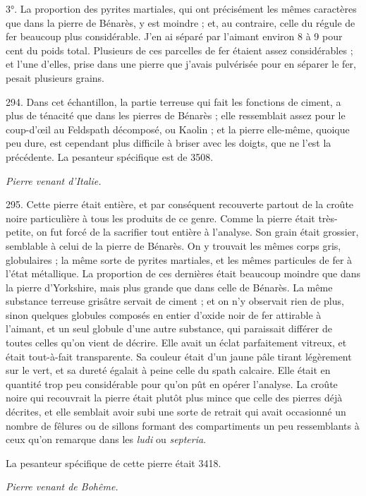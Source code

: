 \documentclass[a4paper, 11pt, oneside, polutonikogreek, french]{article}
\begin{document}
3°. La proportion des pyrites martiales, qui ont précisément les mêmes caractères que dans la pierre de Bénarès, y est moindre ; et, au contraire, celle du régule de fer beaucoup plus considérable. J'en ai séparé par l'aimant environ 8 à 9 pour cent du poids total. Plusieurs de ces parcelles de fer étaient assez considérables ; et l'une d'elles, prise dans une pierre que j'avais pulvérisée pour en séparer le fer, pesait plusieurs grains.

294. Dans cet échantillon, la partie terreuse qui fait les fonctions de ciment, a plus de ténacité que dans les pierres de Bénarès ; elle ressemblait assez pour le coup-d'œil au Feldspath décomposé, ou Kaolin ; et la pierre elle-même, quoique peu dure, est cependant plus difficile à briser avec les doigts, que ne l'est la précédente. La pesanteur spécifique est de 3508.

\emph{Pierre venant d'Italie.}

295. Cette pierre était entière, et par conséquent recouverte partout de la croûte noire particulière à tous les produits de ce genre. Comme la pierre était très-petite, on fut forcé de la sacrifier tout entière à l'analyse. Son grain était grossier, semblable à celui de la pierre de Bénarès. On y trouvait les mêmes corps gris, globulaires ; la même sorte de pyrites martiales, et les mêmes particules de fer à l'état métallique. La proportion de ces dernières était beaucoup moindre que dans la pierre d'Yorkshire, mais plus grande que dans celle de Bénarès. La même substance terreuse grisâtre servait de ciment ; et on n'y observait rien de plus, sinon quelques globules composés en entier d'oxide noir de fer attirable à l'aimant, et un seul globule d'une autre substance, qui paraissait différer de toutes celles qu'on vient de décrire. Elle avait un éclat parfaitement vitreux, et était tout-à-fait transparente. Sa couleur était d'un jaune pâle tirant légèrement sur le vert, et sa dureté égalait à peine celle du spath calcaire. Elle était en quantité trop peu considérable pour qu'on pût en opérer l'analyse. La croûte noire qui recouvrait la pierre était plutôt plus mince que celle des pierres déjà décrites, et elle semblait avoir subi une sorte de retrait qui avait occasionné un nombre de fêlures ou de sillons formant des compartiments un peu ressemblants à ceux qu'on remarque dans les \emph{ludi} ou \emph{septeria}.

La pesanteur spécifique de cette pierre était 3418.

\emph{Pierre venant de Bohême.}
\end{document}
